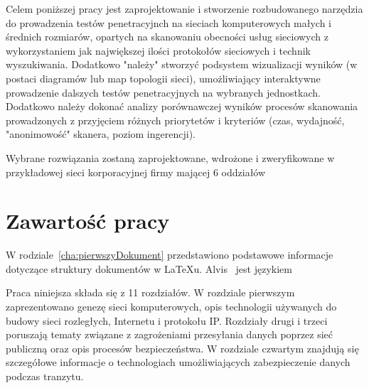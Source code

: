 Celem poniższej pracy jest zaprojektowanie i stworzenie rozbudowanego narzędzia do prowadzenia testów penetracyjnch na sieciach komputerowych małych i średnich rozmiarów, opartych na skanowaniu obecności usług sieciowych z wykorzystaniem jak największej ilości protokołów sieciowych i technik wyszukiwania. Dodatkowo "należy" stworzyć podsystem wizualizacji wyników (w postaci diagramów lub map topologii sieci), umożliwiający interaktywne prowadzenie dalszych testów penetracyjnych na wybranych jednostkach. Dodatkowo należy dokonać analizy porównawczej wyników procesów skanowania prowadzonych z przyjęciem różnych priorytetów i kryteriów (czas, wydajność, "anonimowość" skanera, poziom ingerencji).

Wybrane rozwiązania zostaną zaprojektowane, wdrożone i zweryfikowane w
przykładowej sieci korporacyjnej firmy mającej 6 oddziałów



\section{Zawartość pracy}
\label{sec:zawartoscPracy}

W rodziale~\ref{cha:pierwszyDokument} przedstawiono podstawowe informacje dotyczące struktury dokumentów w \LaTeX u. Alvis~\cite{Alvis2011} jest językiem

Praca niniejsza składa się z 11 rozdziałów. W rozdziale pierwszym
zaprezentowano genezę sieci komputerowych, opis technologii używanych do budowy
sieci rozległych, Internetu i protokołu IP.
Rozdziały drugi i trzeci poruszają tematy związane z zagrożeniami przesyłania danych
poprzez sieć publiczną oraz opis procesów bezpieczeństwa.
W rozdziale czwartym znajdują się szczegółowe informacje o technologiach
umożliwiających zabezpieczenie danych podczas tranzytu.
